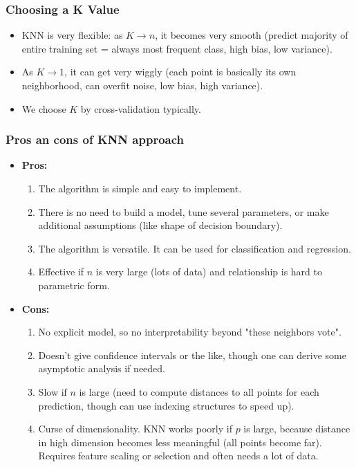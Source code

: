 \documentclass[11pt]{article}
\begin{document}
\subsubsection{Choosing a K Value}
\begin{itemize}
    \item KNN is very flexible: as $K \to n$, it becomes very smooth (predict majority of entire training set = always most frequent class, high bias, low variance).
    \item As $K \to 1$, it can get very wiggly (each point is basically its own neighborhood, can overfit noise, low bias, high variance).
    \item We choose $K$ by cross-validation typically.
\end{itemize}

\subsubsection{Pros an cons of KNN approach}
\begin{itemize}
    \item \textbf{Pros:}
        \begin{enumerate}
            \item The algorithm is simple and easy to implement.
            \item There is no need to build a model, tune several parameters, or make additional assumptions (like shape of decision boundary).
            \item The algorithm is versatile. It can be used for classification and regression.
            \item Effective if $n$ is very large (lots of data) and relationship is hard to parametric form.
        \end{enumerate}
    \item \textbf{Cons:}
        \begin{enumerate}
            \item No explicit model, so no interpretability beyond "these neighbors vote".
            \item Doesn’t give confidence intervals or the like, though one can derive some asymptotic analysis if needed.
            \item Slow if $n$ is large (need to compute distances to all points for each prediction, though can use indexing structures to speed up).
            \item Curse of dimensionality. KNN works poorly if $p$ is large, because distance in high dimension becomes less meaningful (all points become far). Requires feature scaling or selection and often needs a lot of data.
        \end{enumerate}
\end{itemize}
\end{document}
